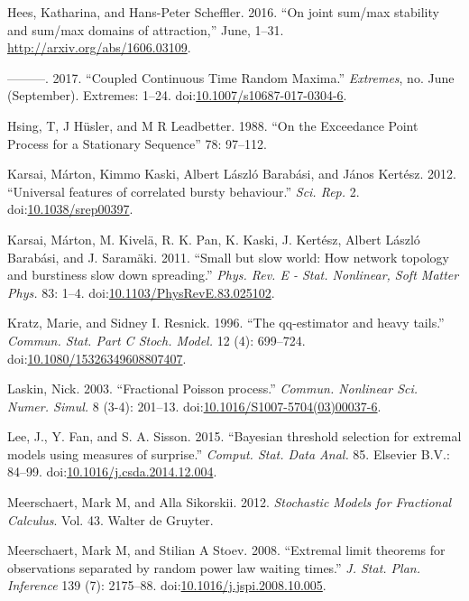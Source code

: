 \documentclass[smallextended]{svjour3}       %
\begin{document}
\hypertarget{ref-Hees16}{}
Hees, Katharina, and Hans-Peter Scheffler. 2016. ``On joint sum/max
stability and sum/max domains of attraction,'' June, 1--31.
\url{http://arxiv.org/abs/1606.03109}.

\hypertarget{ref-Hees17}{}
---------. 2017. ``Coupled Continuous Time Random Maxima.''
\emph{Extremes}, no. June (September). Extremes: 1--24.
doi:\href{https://doi.org/10.1007/s10687-017-0304-6}{10.1007/s10687-017-0304-6}.

\hypertarget{ref-Hsing88}{}
Hsing, T, J Hüsler, and M R Leadbetter. 1988. ``On the Exceedance Point
Process for a Stationary Sequence'' 78: 97--112.

\hypertarget{ref-Karsai2012}{}
Karsai, Márton, Kimmo Kaski, Albert László Barabási, and János Kertész.
2012. ``Universal features of correlated bursty behaviour.'' \emph{Sci.
Rep.} 2.
doi:\href{https://doi.org/10.1038/srep00397}{10.1038/srep00397}.

\hypertarget{ref-Karsai2011}{}
Karsai, Márton, M. Kivelä, R. K. Pan, K. Kaski, J. Kertész, Albert
László Barabási, and J. Saramäki. 2011. ``Small but slow world: How
network topology and burstiness slow down spreading.'' \emph{Phys. Rev.
E - Stat. Nonlinear, Soft Matter Phys.} 83: 1--4.
doi:\href{https://doi.org/10.1103/PhysRevE.83.025102}{10.1103/PhysRevE.83.025102}.

\hypertarget{ref-Kratz96}{}
Kratz, Marie, and Sidney I. Resnick. 1996. ``The qq-estimator and heavy
tails.'' \emph{Commun. Stat. Part C Stoch. Model.} 12 (4): 699--724.
doi:\href{https://doi.org/10.1080/15326349608807407}{10.1080/15326349608807407}.

\hypertarget{ref-Laskin2003}{}
Laskin, Nick. 2003. ``Fractional Poisson process.'' \emph{Commun.
Nonlinear Sci. Numer. Simul.} 8 (3-4): 201--13.
doi:\href{https://doi.org/10.1016/S1007-5704(03)00037-6}{10.1016/S1007-5704(03)00037-6}.

\hypertarget{ref-Lee15}{}
Lee, J., Y. Fan, and S. A. Sisson. 2015. ``Bayesian threshold selection
for extremal models using measures of surprise.'' \emph{Comput. Stat.
Data Anal.} 85. Elsevier B.V.: 84--99.
doi:\href{https://doi.org/10.1016/j.csda.2014.12.004}{10.1016/j.csda.2014.12.004}.

\hypertarget{ref-MeerschaertSikorskii}{}
Meerschaert, Mark M, and Alla Sikorskii. 2012. \emph{Stochastic Models
for Fractional Calculus}. Vol. 43. Walter de Gruyter.

\hypertarget{ref-MeerschaertStoev08}{}
Meerschaert, Mark M, and Stilian A Stoev. 2008. ``Extremal limit
theorems for observations separated by random power law waiting times.''
\emph{J. Stat. Plan. Inference} 139 (7): 2175--88.
doi:\href{https://doi.org/10.1016/j.jspi.2008.10.005}{10.1016/j.jspi.2008.10.005}.
\end{document}
